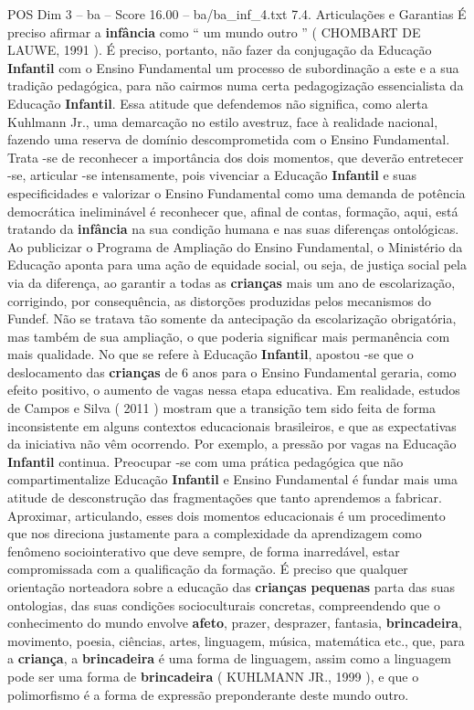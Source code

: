 \begin{textsample}{POS Dim 3 – ba – Score 16.00 – ba/ba\_inf\_4.txt}  \label{ex:f3_pos_176}
7.4.
Articulações e Garantias É preciso afirmar a \textbf{infância} como “ um mundo outro ” ( CHOMBART DE LAUWE, 1991 ).
É preciso, portanto, não fazer da conjugação da Educação \textbf{Infantil} com o Ensino Fundamental um processo de subordinação a este e a sua tradição pedagógica, para não cairmos numa certa pedagogização essencialista da Educação \textbf{Infantil}.
Essa atitude que defendemos não significa, como alerta Kuhlmann Jr., uma demarcação no estilo avestruz, face à realidade nacional, fazendo uma reserva de domínio descomprometida com o Ensino Fundamental.
Trata -se de reconhecer a importância dos dois momentos, que deverão entretecer -se, articular -se intensamente, pois vivenciar a Educação \textbf{Infantil} e suas especificidades e valorizar o Ensino Fundamental como uma demanda de potência democrática ineliminável é reconhecer que, afinal de contas, formação, aqui, está tratando da \textbf{infância} na sua condição humana e nas suas diferenças ontológicas.
Ao publicizar o Programa de Ampliação do Ensino Fundamental, o Ministério da Educação aponta para uma ação de equidade social, ou seja, de justiça social pela via da diferença, ao garantir a todas as \textbf{crianças} mais um ano de escolarização, corrigindo, por consequência, as distorções produzidas pelos mecanismos do Fundef.
Não se tratava tão somente da antecipação da escolarização obrigatória, mas também de sua ampliação, o que poderia significar mais permanência com mais qualidade.
No que se refere à Educação \textbf{Infantil}, apostou -se que o deslocamento das \textbf{crianças} de 6 anos para o Ensino Fundamental geraria, como efeito positivo, o aumento de vagas nessa etapa educativa.
Em realidade, estudos de Campos e Silva ( 2011 ) mostram que a transição tem sido feita de forma inconsistente em alguns contextos educacionais brasileiros, e que as expectativas da iniciativa não vêm ocorrendo.
Por exemplo, a pressão por vagas na Educação \textbf{Infantil} continua.
Preocupar -se com uma prática pedagógica que não compartimentalize Educação \textbf{Infantil} e Ensino Fundamental é fundar mais uma atitude de desconstrução das fragmentações que tanto aprendemos a fabricar.
Aproximar, articulando, esses dois momentos educacionais é um procedimento que nos direciona justamente para a complexidade da aprendizagem como fenômeno sociointerativo que deve sempre, de forma inarredável, estar compromissada com a qualificação da formação.
É preciso que qualquer orientação norteadora sobre a educação das \textbf{crianças} \textbf{pequenas} parta das suas ontologias, das suas condições socioculturais concretas, compreendendo que o conhecimento do mundo envolve \textbf{afeto}, prazer, desprazer, fantasia, \textbf{brincadeira}, movimento, poesia, ciências, artes, linguagem, música, matemática etc., que, para a \textbf{criança}, a \textbf{brincadeira} é uma forma de linguagem, assim como a linguagem pode ser uma forma de \textbf{brincadeira} ( KUHLMANN JR., 1999 ), e que o polimorfismo é a forma de expressão preponderante deste mundo outro.

\end{textsample}
